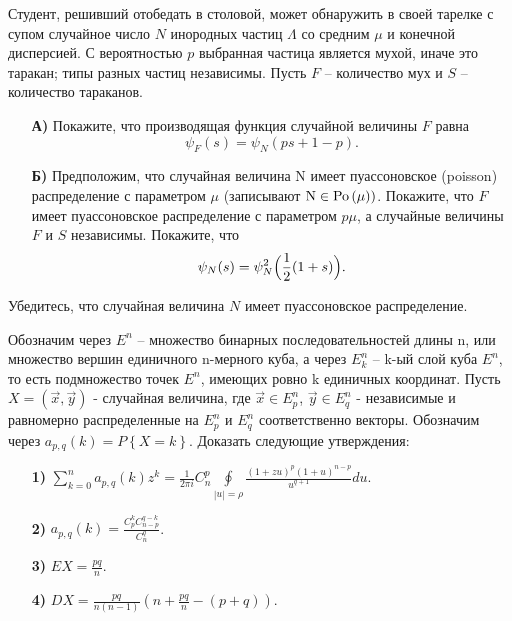 \begin{problem}
Студент, решивший отобедать в 
столовой, может обнаружить в своей тарелке с супом случайное число $N$ 
инородных частиц $\Lambda $ со средним $\mu $ и конечной дисперсией. С 
вероятностью $p$ выбранная частица является мухой, иначе это таракан; типы 
разных частиц независимы. Пусть $F$ -- количество мух и $S$ -- количество тараканов.

\begin{enumerate}
\item[\textbf{А)}] Покажите, что производящая функция случайной величины $F$ равна
\[
\psi _F (s)=\psi _N (ps+1-p).
\]

\item[\textbf{Б)}] Предположим, что случайная величина N имеет пуассоновское 
(poisson) распределение с параметром $\mu $ (записывают $\mbox{N}\in 
\mathrm{Po}\left( \mu \right))$. Покажите, что $F$ имеет пуассоновское распределение с 
параметром $p\mu $, а случайные величины $F$ и $S$ независимы. Покажите, что
\[
\psi _N (s)=\psi _N^2 \Bigl( {\frac{1}{2}(1+s)} \Bigr).
\]
\end{enumerate}
Убедитесь, что случайная величина $N$ имеет пуассоновское распределение.
\end{problem}

\begin{problem} 
Обозначим через $E^n$ -- множество бинарных последовательностей длины n, или множество вершин 
единичного n-мерного куба, а через $E_k^n $ -- k-ый слой куба $E^n$, то есть 
подмножество точек $E^n$, имеющих ровно k единичных координат. Пусть 
$X=\left( {\vec {x},\vec {y}} \right)$ - случайная величина, где $\vec 
{x}\in E_p^n $, $\vec {y}\in E_q^n $ - независимые и равномерно 
распределенные на $E_p^n $ и $E_q^n $ соответственно векторы. Обозначим 
через $a_{p,q} (k)=P\left\{ {X=k} \right\}$. Доказать следующие утверждения:

\begin{enumerate}
\item[\textbf{1)}] $\sum\limits_{k=0}^n {a_{p,q} (k)z^k} =\frac{1}{2\pi i}C_n^p 
\oint\limits_{\left| u \right|=\rho } 
{\frac{(1+zu)^p(1+u)^{n-p}}{u^{q+1}}du} $.

\item[\textbf{2)}] $a_{p,q} (k)=\frac{C_p^k C_{n-p}^{q-k} }{C_n^q }$.

\item[\textbf{3)}] $EX=\frac{pq}{n}$.

\item[\textbf{4)}] $DX=\frac{pq}{n(n-1)}\left( {n+\frac{pq}{n}-(p+q)} \right)$.
\end{enumerate}
\end{problem}






